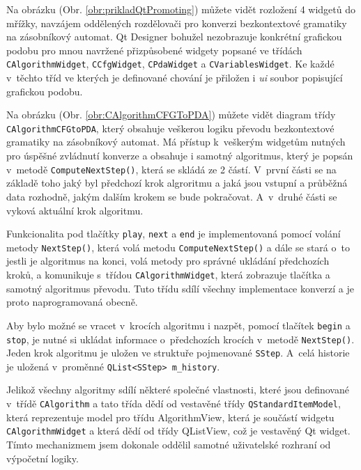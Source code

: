 
Na obrázku (Obr. \ref{obr:prikladQtPromoting}) můžete vidět rozložení 4 widgetů do mřížky, navzájem oddělených rozdělovači pro konverzi bezkontextové gramatiky na zásobníkový automat. Qt Designer bohužel nezobrazuje konkrétní grafickou podobu pro mnou navržené přizpůsobené widgety popsané ve třídách \texttt{CAlgorithmWidget}, \texttt{CCfgWidget}, \texttt{CPdaWidget} a \texttt{CVariablesWidget}. Ke každé v~těchto tříd ve kterých je definované chování je přiložen i \textit{ui} soubor popisující grafickou podobu.


Na obrázku (Obr. \ref{obr:CAlgorithmCFGToPDA}) můžete vidět diagram třídy \texttt{CAlgorithmCFGtoPDA}, který obsahuje veškerou logiku převodu bezkontextové gramatiky na zásobníkový automat. Má přístup k~veškerým widgetům nutných pro úspěšné zvládnutí konverze a obsahuje i samotný algoritmus, který je popsán v~metodě \texttt{ComputeNextStep()}, která se skládá ze 2 částí. V~první části se na základě toho jaký byl předchozí krok algroritmu a jaká jsou vstupní a průběžná data rozhodně, jakým dalším  krokem se bude pokračovat. A~v~druhé části se vyková aktuální krok algoritmu.

Funkcionalita pod tlačítky \texttt{play}, \texttt{next} a \texttt{end} je implementovaná pomocí volání metody \texttt{NextStep()}, která volá metodu \texttt{ComputeNextStep()} a dále se stará o~to jestli je algoritmus na konci, volá metody pro správné ukládání předchozích kroků, a komunikuje s~třídou \texttt{CAlgorithmWidget}, která zobrazuje tlačítka a samotný algoritmus převodu. Tuto třídu sdílí všechny implementace konverzí a je proto naprogramovaná obecně.

Aby bylo možné se vracet v~krocích algoritmu i nazpět, pomocí tlačítek \texttt{begin} a \texttt{stop}, je nutné si ukládat informace o~předchozích krocích v~metodě \texttt{NextStep()}. Jeden krok algoritmu je uložen ve struktuře pojmenované \texttt{SStep}. A~celá historie je uložená v~proměnné \texttt{QList\textless{}SStep\textgreater{} m\_history}.

Jelikož všechny algoritmy sdílí některé společné vlastnosti, které jsou definované v~třídě \texttt{CAlgorithm} a tato třída dědí od vestavěné třídy \texttt{QStandardItemModel}, která reprezentuje model pro třídu AlgorithmView, která je součástí widgetu \texttt{CAlgorithmWidget} a která dědí od třídy QListView, což je vestavěný Qt widget. Tímto mechanizmem jsem dokonale oddělil samotné uživatelské rozhraní od výpočetní logiky.

